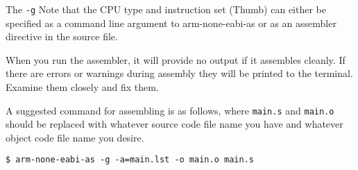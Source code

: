 The \texttt{-g}
Note that the CPU type and instruction set (Thumb) can either be specified as a command line argument to arm-none-eabi-as or as an assembler directive in the source file. 

When you run the assembler, it will provide no output if it assembles cleanly. If there are errors or warnings during assembly they will be printed to the terminal. Examine them closely and fix them.

A suggested command for assembling is as follows, where \texttt{main.s} and \texttt{main.o} should be replaced with whatever source code file name you have and whatever object code file name you desire.
\begin{lstlisting}[style=BashStyle]
$ arm-none-eabi-as -g -a=main.lst -o main.o main.s
\end{lstlisting}

